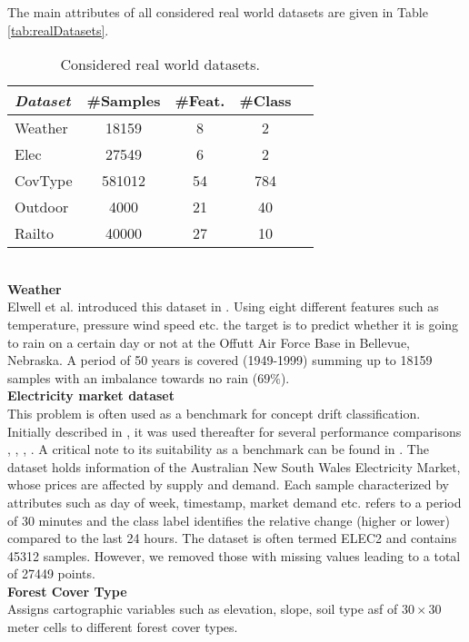 \documentclass[conference]{IEEEtran}
\begin{document}
The main attributes of all considered real world datasets are given in Table \ref{tab:realDatasets}.
\begin{table}
\def\arraystretch{0.9}
\footnotesize
\centering
\caption{Considered real world datasets.}
\label{tab:realDatasets}
\begin{tabular}{l|cccc}
\textit{Dataset} & \#Samples&\#Feat.&\#Class\\\hline
\rule{0pt}{8pt}
Weather & 18159 & 8 & 2\\
Elec & 27549 & 6 & 2\\
CovType & 581012 & 54 & 784\\
Outdoor & 4000 & 21 & 40\\
Railto & 40000 & 27 & 10\\
\end{tabular}
\label{tab:datasets}
\end{table}
\\\textbf{Weather}\\
Elwell et al. introduced this dataset in \cite{5975223}. Using eight different features such as temperature, pressure wind speed etc. the target is to predict 
whether it is going to rain on a certain day or not at the Offutt Air Force Base in Bellevue, Nebraska.
A period of 50 years is covered (1949-1999) summing up to 18159 samples with an imbalance towards no rain ($69\%$).\\
\textbf{Electricity market dataset}\\
This problem is often used as a benchmark for concept drift classification. Initially described in \cite{harries1999splice}, it was used thereafter for several performance comparisons \cite{baena2006early}, \cite{kuncheva2008adaptive}, \cite{Bifet:2013:EDS:2480362.2480516}, \cite{gama2004learning}. 
A critical note to its suitability as a benchmark can be found in \cite{zliobaite2013good}.
The dataset holds information of the Australian New South Wales Electricity Market, whose prices are affected by supply and demand. 
Each sample characterized by attributes such as day of week, timestamp, market demand etc. refers to a period of 30 minutes and the class label identifies the relative change (higher or lower) compared to the last 24 hours.
The dataset is often termed ELEC2 and contains 45312 samples. However, we removed those with missing values leading to a total of 27449 points.\\
\textbf{Forest Cover Type}\\
Assigns cartographic variables such as elevation, slope, soil type asf of $30 \times 30$ meter cells to different forest cover types. 
\end{document}
